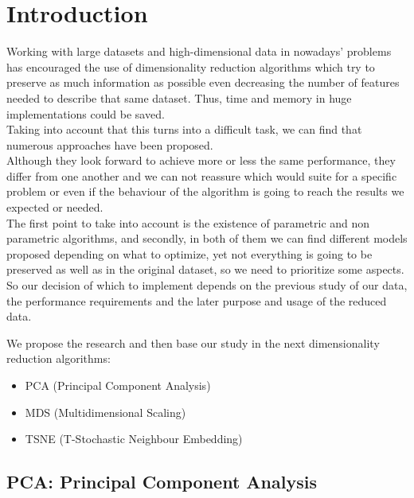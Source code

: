 \documentclass[a4paper,11pt,spanish]{report}
\begin{document}
\newpage
{}


\chapter{Introduction}
\label{chap:intro}

Working with large datasets and high-dimensional data in nowadays' problems has encouraged the use of dimensionality reduction algorithms which try to preserve as much information as possible even decreasing the number of features needed to describe that same dataset. Thus, time and memory in huge implementations could be saved. \\
Taking into account that this turns into a difficult task, we can find that numerous approaches have been proposed.\\
Although they look forward to achieve more or less the same performance, they differ from one another and we can not reassure which would suite for a specific problem or even if the behaviour of the algorithm is going to reach the results we expected or needed.\\
The first point to take into account is the existence of parametric and non parametric algorithms, and secondly, in both of them we can find different models proposed depending on what to optimize, yet not everything is going to be preserved as well as in the original dataset, so we need to prioritize some aspects.\\
So our decision of which to implement depends on the previous study of our data, the performance requirements and the later purpose and usage of the reduced data.

We propose the research and then base our study in the next dimensionality reduction algorithms:\\
\begin{itemize}
\item PCA (Principal Component Analysis)
\item MDS (Multidimensional Scaling)
\item TSNE (T-Stochastic Neighbour Embedding)
\end{itemize}

\section{PCA: Principal Component Analysis}
\label{sec:pca}
\end{document}
